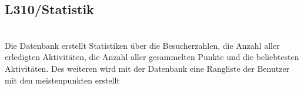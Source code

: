\subsection{L310/Statistik} \\
Die Datenbank erstellt Statistiken über die Besucherzahlen, die Anzahl aller erledigten Aktivitäten, die Anzahl aller gesammelten Punkte und die beliebtesten Aktivitäten. Des weiteren wird mit der Datenbank eine Rangliste der Benutzer mit den meistenpunkten erstellt \\


